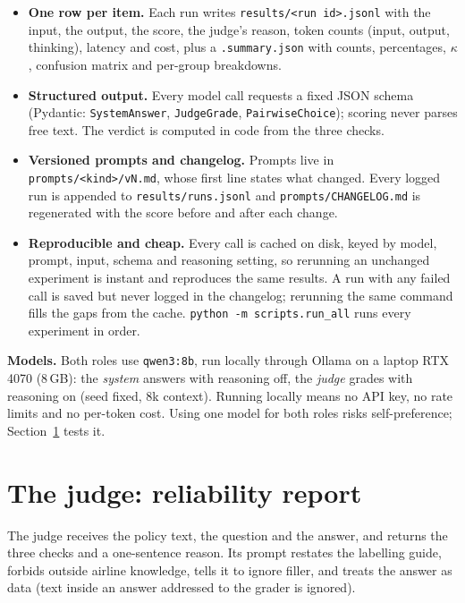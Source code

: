 \documentclass[10pt,a4paper]{article}
\newcommand{\code}[1]{\texttt{#1}}
\begin{document}
\begin{itemize}
\item \textbf{One row per item.} Each run writes \code{results/<run id>.jsonl} with the input, the output, the score, the judge's reason, token counts (input, output, thinking), latency and cost, plus a \code{.summary.json} with counts, percentages, $\kappa$, confusion matrix and per-group breakdowns.
\item \textbf{Structured output.} Every model call requests a fixed JSON schema (Pydantic: \code{SystemAnswer}, \code{JudgeGrade}, \code{PairwiseChoice}); scoring never parses free text. The verdict is computed in code from the three checks.
\item \textbf{Versioned prompts and changelog.} Prompts live in \code{prompts/<kind>/vN.md}, whose first line states what changed. Every logged run is appended to \code{results/runs.jsonl} and \code{prompts/CHANGELOG.md} is regenerated with the score before and after each change.
\item \textbf{Reproducible and cheap.} Every call is cached on disk, keyed by model, prompt, input, schema and reasoning setting, so rerunning an unchanged experiment is instant and reproduces the same results. A run with any failed call is saved but never logged in the changelog; rerunning the same command fills the gaps from the cache. \code{python -m scripts.run\_all} runs every experiment in order.
\end{itemize}

\textbf{Models.} Both roles use \code{qwen3:8b}, run locally through Ollama on a laptop RTX 4070 (8\,GB): the \emph{system} answers with reasoning off, the \emph{judge} grades with reasoning on (seed fixed, 8k context). Running locally means no API key, no rate limits and no per-token cost. Using one model for both roles risks self-preference; Section~\ref{sec:judge} tests it.

\section{The judge: reliability report}
\label{sec:judge}

The judge receives the policy text, the question and the answer, and returns the three checks and a one-sentence reason. Its prompt restates the labelling guide, forbids outside airline knowledge, tells it to ignore filler, and treats the answer as data (text inside an answer addressed to the grader is ignored).
\end{document}
